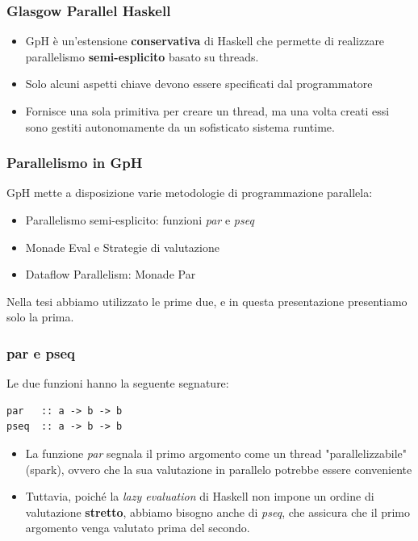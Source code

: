 \documentclass[14pt]{beamer}
\begin{document}
\begin{frame}
\frametitle{Glasgow Parallel Haskell}
\begin{itemize}
\item GpH è un'estensione \textbf{conservativa} di Haskell che permette di
  realizzare parallelismo \textbf{semi-esplicito} basato su threads.

\item Solo alcuni aspetti chiave devono essere specificati dal programmatore 
\item 
  Fornisce una sola primitiva per creare un thread, ma una volta creati essi sono gestiti autonomamente da un sofisticato sistema runtime.\\ [2ex]
\end{itemize}
\end{frame}

\begin{frame}
\frametitle{Parallelismo in GpH}
GpH mette a disposizione varie metodologie di programmazione parallela:
\begin{itemize}
\item Parallelismo semi-esplicito: funzioni \textit{par} e \textit{pseq}
\item Monade Eval e Strategie di valutazione
\item Dataflow Parallelism: Monade Par
\end{itemize}
Nella tesi abbiamo utilizzato le prime due, e in questa presentazione presentiamo solo la prima.
\end{frame}

\begin{frame}[fragile]
\frametitle{par e pseq}
Le due funzioni hanno la seguente segnature: 
\begin{verbatim}
par   :: a -> b -> b
pseq  :: a -> b -> b
\end{verbatim}
\begin{itemize}
\item La funzione
\textit{par} segnala il   primo argomento come un thread
"parallelizzabile" (spark), ovvero che la sua valutazione in parallelo
potrebbe essere conveniente
\item Tuttavia, poiché la \emph{lazy evaluation} di Haskell non impone
  un ordine di valutazione \textbf{stretto}, abbiamo bisogno anche di
  \textit{pseq}, che assicura che il primo argomento venga valutato
  prima del secondo.
\end{itemize}

\end{frame}
\end{document}
